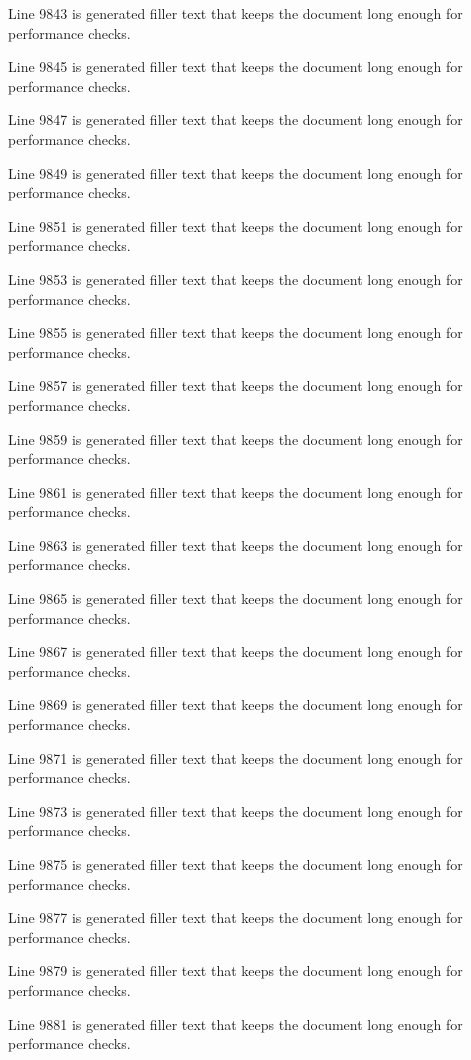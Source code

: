 Line 9843 is generated filler text that keeps the document long enough for performance checks.

Line 9845 is generated filler text that keeps the document long enough for performance checks.

Line 9847 is generated filler text that keeps the document long enough for performance checks.

Line 9849 is generated filler text that keeps the document long enough for performance checks.

Line 9851 is generated filler text that keeps the document long enough for performance checks.

Line 9853 is generated filler text that keeps the document long enough for performance checks.

Line 9855 is generated filler text that keeps the document long enough for performance checks.

Line 9857 is generated filler text that keeps the document long enough for performance checks.

Line 9859 is generated filler text that keeps the document long enough for performance checks.

Line 9861 is generated filler text that keeps the document long enough for performance checks.

Line 9863 is generated filler text that keeps the document long enough for performance checks.

Line 9865 is generated filler text that keeps the document long enough for performance checks.

Line 9867 is generated filler text that keeps the document long enough for performance checks.

Line 9869 is generated filler text that keeps the document long enough for performance checks.

Line 9871 is generated filler text that keeps the document long enough for performance checks.

Line 9873 is generated filler text that keeps the document long enough for performance checks.

Line 9875 is generated filler text that keeps the document long enough for performance checks.

Line 9877 is generated filler text that keeps the document long enough for performance checks.

Line 9879 is generated filler text that keeps the document long enough for performance checks.

Line 9881 is generated filler text that keeps the document long enough for performance checks.

